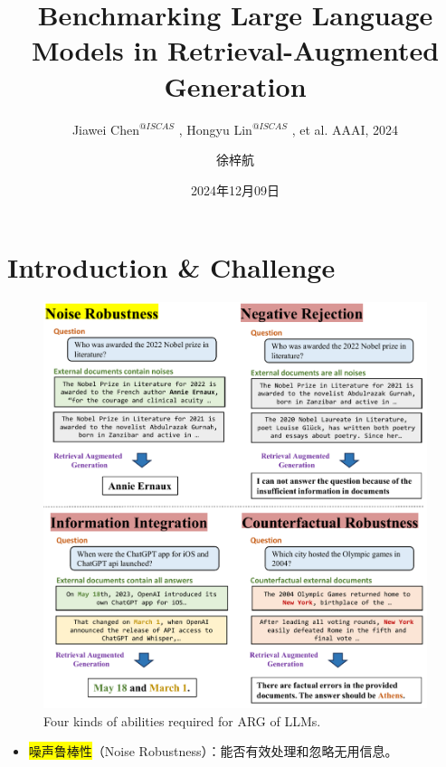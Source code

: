 \documentclass{beamer}
\author{徐梓航}
\title{Benchmarking Large Language Models in Retrieval-Augmented Generation}
\subtitle{
    \scriptsize
    Jiawei Chen\scriptsize\texorpdfstring{$^{@ISCAS}$}{\textit{@ISCAS}}
    \normalfont
    , Hongyu Lin\scriptsize\texorpdfstring{$^{@ISCAS
    }$}{\textit{@ISCAS}}
    \normalfont
    , et al. AAAI, 2024
}
\institute{华中科技大学计算机科学与技术学院}
\date{2024年12月09日}
\begin{document}
\begin{frame}
    \titlepage
    \begin{figure}[htpb]
    \end{figure}
\end{frame}

\begin{frame}
    \tableofcontents[sectionstyle=show,subsectionstyle=show/shaded/hide,subsubsectionstyle=show/shaded/hide]
\end{frame}

\section{Introduction \& Challenge}

\begin{frame}
    \begin{figure}[h]
        \centering
        \includegraphics[height=.75\textheight]{./images/figures/intro.pdf}
        \caption{Four kinds of abilities required for ARG of LLMs.}
    \end{figure}
    \begin{itemize}
        \item {\colorbox{yellow}{噪声鲁棒性}（Noise Robustness）：能否有效处理和忽略无用信息。}
    \end{itemize}
\end{frame}
\end{document}
